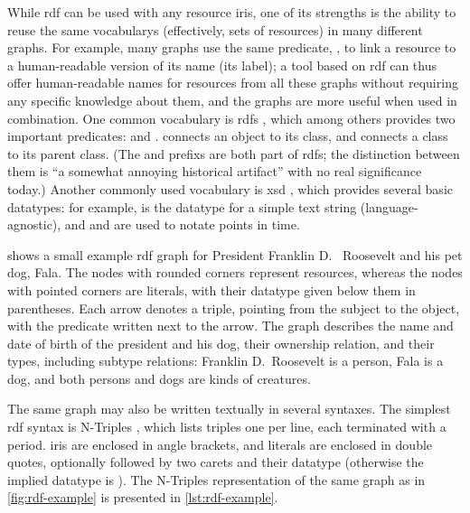While \gls{rdf} can be used with any \gls{resource} \glspl{iri},
one of its strengths is the ability to reuse the same \glspl{vocabulary}
(effectively, sets of \glspl{resource})
in many different graphs.
For example, many graphs use the same \gls{predicate}, ,
to link a \gls{resource} to a human-readable version of its name (its label);
a tool based on \gls{rdf} can thus offer human-readable names for \glspl{resource} from all these graphs
without requiring any specific knowledge about them,
and the graphs are more useful when used in combination.
One common \gls{vocabulary} is \acrfull{rdfs} \cite{Guha:14:RS},
which among others provides two important predicates:
 and .
 connects an object to its class,
and  connects a class to its parent class.
(The  and  \glspl{prefix} are both part of \acrlong{rdfs};
the distinction between them is “a somewhat annoying historical artifact” \cite{Schreiber:14:RP}
with no real significance today.)
Another commonly used \gls{vocabulary} is \gls{xsd} \cite{Malhotra:04:XSP},
which provides several basic datatypes:
for example,  is the datatype for a simple text string (language-agnostic),
and  and  are used to notate points in time.

 shows a small example \gls{rdf} graph
for President Franklin D.~ Roosevelt and his pet dog, Fala.
The nodes with rounded corners represent \glspl{resource},
whereas the nodes with pointed corners are literals,
with their datatype given below them in parentheses.
Each arrow denotes a \gls{triple}, pointing from the \gls{subject} to the \gls{object},
with the \gls{predicate} written next to the arrow.
The graph describes the name and date of birth of the president and his dog,
their ownership relation,
and their types, including subtype relations:
Franklin D.~Roosevelt is a person, Fala is a dog,
and both persons and dogs are kinds of creatures.

The same graph may also be written textually in several syntaxes.
The simplest \gls{rdf} syntax is \gls{N-Triples} \cite{Seaborne:14:RN},
which lists \glspl{triple} one per line, each terminated with a period.
\Glspl{iri} are enclosed in angle brackets,
and literals are enclosed in double quotes,
optionally followed by two carets and their datatype
(otherwise the implied datatype is ).
The \gls{N-Triples} representation of the same graph as in \cref{fig:rdf-example}
is presented in \cref{lst:rdf-example}.

